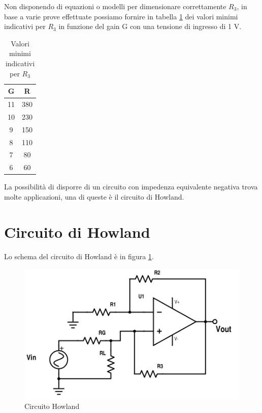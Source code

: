 \documentclass[journal, a4paper]{IEEEtran}
\begin{document}
Non disponendo di equazioni o modelli per dimensionare correttamente $R_3$, in base a varie prove effettuate possiamo fornire in tabella \ref{tab:r3} dei valori minimi indicativi per $R_3$ in funzione del gain G con una tensione di ingresso di 1 V.

\begin {table}[htp]
\caption {Valori minimi indicativi per $R_3$} 
\label{tab:r3} 
\begin{center}
\begin{tabular}{|c|c|}
\hline 
G & R \\ 
\hline 
11 & 380 \\ 
\hline 
10 & 230 \\ 
\hline 
9 & 150 \\ 
\hline 
8 & 110 \\ 
\hline 
7 & 80 \\ 
\hline 
6 & 60 \\ 
\hline 
\end{tabular} 
\end{center}
\end {table}

La possibilità di disporre di un circuito con impedenza equivalente negativa trova molte applicazioni, una di queste è il circuito di Howland.

\section{Circuito di Howland}

Lo schema del circuito di Howland è in figura \ref{fig:how}.

\begin{figure}[htp]
\centering
\includegraphics[scale=.3]{negative-impedance}
\caption{Circuito Howland}
\label{fig:how}
\end{figure}
\end{document}

